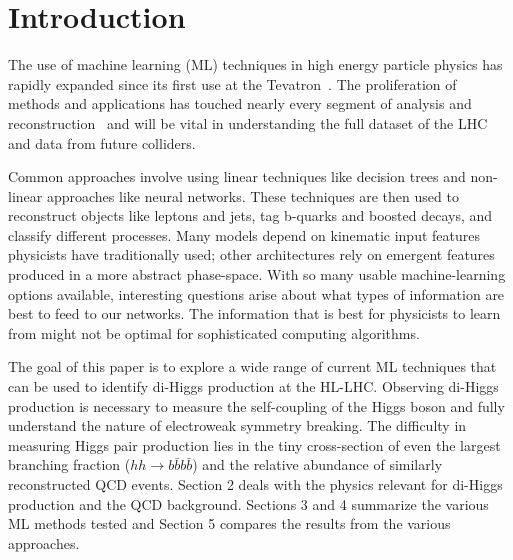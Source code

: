 \section{Introduction}
\label{sec:intro}

The use of machine learning (ML) techniques in high energy particle physics has rapidly expanded since its first use at the Tevatron~\cite{Abazov:2006gd, Aaltonen:2008sy}. The proliferation of methods and applications has touched nearly every segment of analysis and reconstruction~\cite{albertsson2018machine} and will be vital in understanding the full dataset of the LHC and data from future colliders.

Common approaches involve using linear techniques like decision trees and non-linear approaches like neural networks. These techniques are then used to reconstruct objects like leptons and jets, tag b-quarks and boosted decays, and classify different processes. Many models depend on kinematic input features physicists have traditionally used; other architectures rely on emergent features produced in a more abstract phase-space. With so many usable machine-learning options available, interesting questions arise about what types of information are best to feed to our networks. The information that is best for physicists to learn from might not be optimal for sophisticated computing algorithms.

The goal of this paper is to explore a wide range of current ML techniques that can be used to identify di-Higgs production at the HL-LHC. Observing di-Higgs production is necessary to measure the self-coupling of the Higgs boson and fully understand the nature of electroweak symmetry breaking. The difficulty in measuring Higgs pair production lies in the tiny cross-section of even the largest branching fraction ($hh\rightarrow b\bar{b}b\bar{b}$) and the relative abundance of similarly reconstructed QCD events. Section 2 deals with the physics relevant for di-Higgs production and the QCD background. Sections 3 and 4 summarize the various ML methods tested and Section 5 compares the results from the various approaches.
